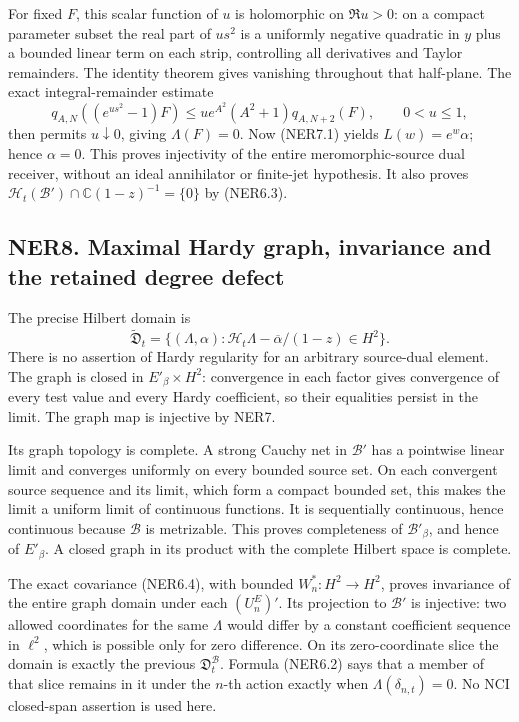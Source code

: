 For fixed \(F\), this scalar function of \(u\) is holomorphic on
\(\Re u>0\): on a compact parameter subset the real part of \(us^2\) is
a uniformly negative quadratic in \(y\) plus a bounded linear term on
each strip, controlling all derivatives and Taylor remainders. The
identity theorem gives vanishing throughout that half-plane. The exact
integral-remainder estimate \[
q_{A,N}((e^{us^2}-1)F)
\le u e^{A^2}(A^2+1)q_{A,N+2}(F),\qquad0<u\le1,
\] then permits \(u\downarrow0\), giving \(\Lambda(F)=0\). Now (NER7.1)
yields \(L(w)=e^w\alpha\); hence \(\alpha=0\). This proves injectivity
of the entire meromorphic-source dual receiver, without an ideal
annihilator or finite-jet hypothesis. It also proves
\(\mathcal H_t(\mathcal B')\cap\mathbb C(1-z)^{-1}=\{0\}\) by (NER6.3).

\subsection{NER8. Maximal Hardy graph, invariance and the retained
degree
defect}\label{ner8.-maximal-hardy-graph-invariance-and-the-retained-degree-defect}

The precise Hilbert domain is \[
\widetilde{\mathfrak D}_t
=\{(\Lambda,\alpha):\mathcal H_t\Lambda-\overline\alpha/(1-z)\in H^2\}.
\tag{NER8.1}
\] There is no assertion of Hardy regularity for an arbitrary
source-dual element. The graph is closed in \(E'_\beta\times H^2\):
convergence in each factor gives convergence of every test value and
every Hardy coefficient, so their equalities persist in the limit. The
graph map is injective by NER7.

Its graph topology is complete. A strong Cauchy net in \(\mathcal B'\)
has a pointwise linear limit and converges uniformly on every bounded
source set. On each convergent source sequence and its limit, which form
a compact bounded set, this makes the limit a uniform limit of
continuous functions. It is sequentially continuous, hence continuous
because \(\mathcal B\) is metrizable. This proves completeness of
\(\mathcal B'_\beta\), and hence of \(E'_\beta\). A closed graph in its
product with the complete Hilbert space is complete.

The exact covariance (NER6.4), with bounded \(W_n^*:H^2\to H^2\), proves
invariance of the entire graph domain under each \((U_n^E)'\). Its
projection to \(\mathcal B'\) is injective: two allowed coordinates for
the same \(\Lambda\) would differ by a constant coefficient sequence in
\(\ell^2\), which is possible only for zero difference. On its
zero-coordinate slice the domain is exactly the previous
\(\mathfrak D_t^{\mathcal B}\). Formula (NER6.2) says that a member of
that slice remains in it under the \(n\)-th action exactly when
\(\Lambda(\delta_{n,t})=0\). No NCI closed-span assertion is used here.

